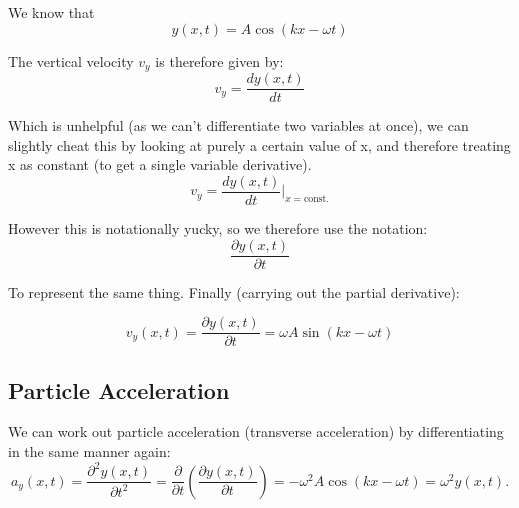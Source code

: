 We know that
\[
    y(x, t) = A \cos(kx - \omega t)
\]

The vertical velocity $v_y$ is therefore given by:
\[
    v_y = \frac{dy(x, t)}{dt}
\]

Which is unhelpful (as we can't differentiate two variables at once), we can slightly cheat this by looking at purely a certain value of x, and therefore treating x as constant (to get a single variable derivative).
\[
    v_y = \frac{dy(x, t)}{dt} \Bigr\rvert_{x = \text{const.}}
\]


However this is notationally yucky, so we therefore use the notation:
\[
    \frac{\partial y(x, t)}{\partial t}
\]

To represent the same thing. Finally (carrying out the partial derivative):

\[
  v_y(x, t) = \frac{\partial y(x, t)}{\partial t} = \omega A \sin(kx - \omega t)
\]

\subsection*{Particle Acceleration}
We can work out particle acceleration (transverse acceleration) by differentiating in the same manner again:
\[
    a_y(x, t) = \frac{\partial^2 y(x, t)}{\partial t^2} = \frac{\partial}{\partial t} \left(\frac{\partial y(x, t)}{\partial t} \right) = - \omega^2 A \cos(kx - \omega t) = \omega^2 y(x, t).
\]

